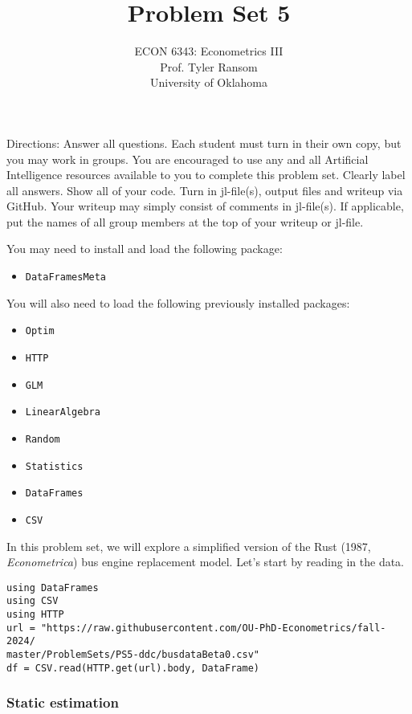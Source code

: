 \documentclass[12pt,english]{article}
\begin{document}
\title{Problem Set 5}
\author{ECON 6343: Econometrics III\\
Prof. Tyler Ransom\\
University of Oklahoma}
\date{}%

\maketitle
Directions: Answer all questions. Each student must turn in their own copy, but you may work in groups. You are encouraged to use any and all Artificial Intelligence resources available to you to complete this problem set. Clearly label all answers. Show all of your code. Turn in jl-file(s), output files and writeup via GitHub. Your writeup may simply consist of comments in jl-file(s). If applicable, put the names of all group members at the top of your writeup or jl-file.

You may need to install and load the following package:
\begin{itemize}
    \item[~] \texttt{DataFramesMeta}
\end{itemize}

You will also need to load the following previously installed packages:
\begin{itemize}
    \item[~] \texttt{Optim} 
    \item[~] \texttt{HTTP} 
    \item[~] \texttt{GLM} 
    \item[~] \texttt{LinearAlgebra} 
    \item[~] \texttt{Random} 
    \item[~] \texttt{Statistics} 
    \item[~] \texttt{DataFrames} 
    \item[~] \texttt{CSV} 
\end{itemize}
\pagebreak
In this problem set, we will explore a simplified version of the Rust (1987, \textit{Econometrica}) bus engine replacement model. Let's start by reading in the data.

\begin{verbatim}
using DataFrames
using CSV
using HTTP
url = "https://raw.githubusercontent.com/OU-PhD-Econometrics/fall-2024/
master/ProblemSets/PS5-ddc/busdataBeta0.csv"
df = CSV.read(HTTP.get(url).body, DataFrame)
\end{verbatim}


\subsubsection*{Static estimation}
\end{document}
